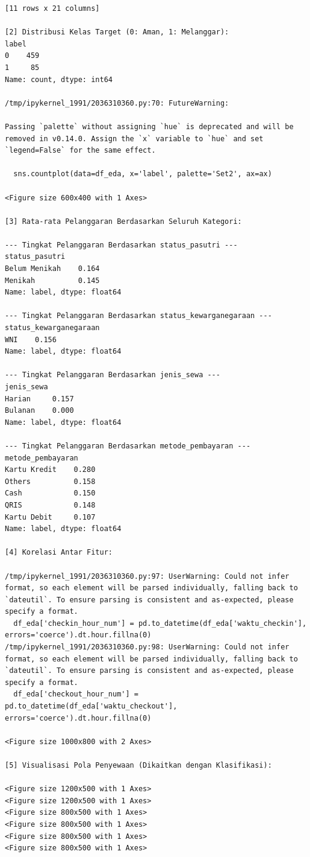 \begin{lstlisting}[caption={Output 16}]
[11 rows x 21 columns]

[2] Distribusi Kelas Target (0: Aman, 1: Melanggar):
label
0    459
1     85
Name: count, dtype: int64

/tmp/ipykernel_1991/2036310360.py:70: FutureWarning: 

Passing `palette` without assigning `hue` is deprecated and will be removed in v0.14.0. Assign the `x` variable to `hue` and set `legend=False` for the same effect.

  sns.countplot(data=df_eda, x='label', palette='Set2', ax=ax)

<Figure size 600x400 with 1 Axes>

[3] Rata-rata Pelanggaran Berdasarkan Seluruh Kategori:

--- Tingkat Pelanggaran Berdasarkan status_pasutri ---
status_pasutri
Belum Menikah    0.164
Menikah          0.145
Name: label, dtype: float64

--- Tingkat Pelanggaran Berdasarkan status_kewarganegaraan ---
status_kewarganegaraan
WNI    0.156
Name: label, dtype: float64

--- Tingkat Pelanggaran Berdasarkan jenis_sewa ---
jenis_sewa
Harian     0.157
Bulanan    0.000
Name: label, dtype: float64

--- Tingkat Pelanggaran Berdasarkan metode_pembayaran ---
metode_pembayaran
Kartu Kredit    0.280
Others          0.158
Cash            0.150
QRIS            0.148
Kartu Debit     0.107
Name: label, dtype: float64

[4] Korelasi Antar Fitur:

/tmp/ipykernel_1991/2036310360.py:97: UserWarning: Could not infer format, so each element will be parsed individually, falling back to `dateutil`. To ensure parsing is consistent and as-expected, please specify a format.
  df_eda['checkin_hour_num'] = pd.to_datetime(df_eda['waktu_checkin'], errors='coerce').dt.hour.fillna(0)
/tmp/ipykernel_1991/2036310360.py:98: UserWarning: Could not infer format, so each element will be parsed individually, falling back to `dateutil`. To ensure parsing is consistent and as-expected, please specify a format.
  df_eda['checkout_hour_num'] = pd.to_datetime(df_eda['waktu_checkout'], errors='coerce').dt.hour.fillna(0)

<Figure size 1000x800 with 2 Axes>

[5] Visualisasi Pola Penyewaan (Dikaitkan dengan Klasifikasi):

<Figure size 1200x500 with 1 Axes>
<Figure size 1200x500 with 1 Axes>
<Figure size 800x500 with 1 Axes>
<Figure size 800x500 with 1 Axes>
<Figure size 800x500 with 1 Axes>
<Figure size 800x500 with 1 Axes>


\end{lstlisting}
